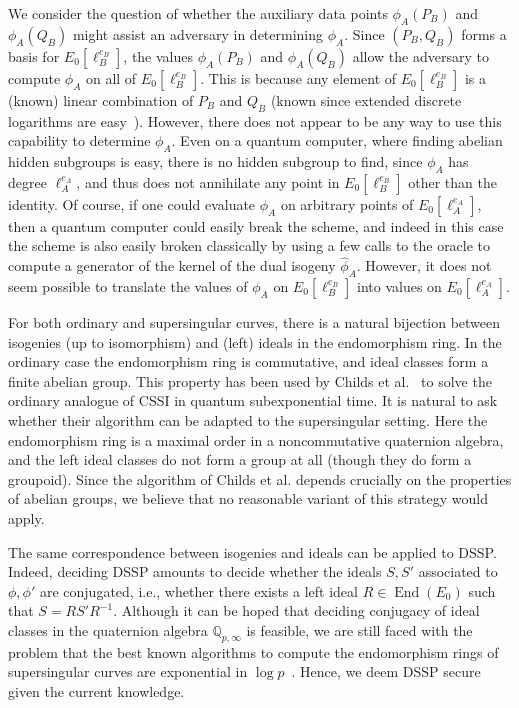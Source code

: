 \documentclass[jmc]{degruyter-journal-a}
\theoremstyle{definition}
\newcommand{\QQ}{{\mathbb{Q}}}
\newcommand{\End}{\operatorname{End}}
\begin{document}
We consider the question of whether the auxiliary data points
$\phi_A(P_B)$ and $\phi_A(Q_B)$ might assist an adversary in
determining $\phi_A$. Since $(P_B,Q_B)$ forms a basis for
$E_0[\ell_B^{e_B}]$, the values $\phi_A(P_B)$ and $\phi_A(Q_B)$ allow
the adversary to compute $\phi_A$ on all of $E_0[\ell_B^{e_B}]$. This
is because any element of $E_0[\ell_B^{e_B}]$ is a (known) linear
combination of $P_B$ and $Q_B$ (known since extended discrete
logarithms are easy~\cite{teske-ph}). However, there does not appear
to be any way to use this capability to determine $\phi_A$. Even on a
quantum computer, where finding abelian hidden subgroups is easy,
there is no hidden subgroup to find, since $\phi_A$ has degree
$\ell_A^{e_A}$, and thus does not annihilate any point in
$E_0[\ell_B^{e_B}]$ other than the identity. Of course, if one could
evaluate $\phi_A$ on arbitrary points of $E_0[\ell_A^{e_A}]$, then a
quantum computer could easily break the scheme, and indeed in this case the
scheme is also easily broken classically by using a few calls to the
oracle to compute a generator of the kernel of the dual isogeny 
$\hat{\phi}_A$. However, it does not seem possible to translate the values of
$\phi_A$ on $E_0[\ell_B^{e_B}]$ into values on $E_0[\ell_A^{e_A}]$.

For both ordinary and supersingular curves, there is a natural
bijection between isogenies (up to isomorphism) and (left) ideals in
the endomorphism ring. In the ordinary case the endomorphism ring is
commutative, and ideal classes form a finite abelian group. This
property has been used by Childs et al.~\cite{CJS} to solve the
ordinary analogue of CSSI in quantum subexponential time. It is
natural to ask whether their algorithm can be adapted to the
supersingular setting. Here the
endomorphism ring is a maximal order in a noncommutative quaternion
algebra, and the left ideal classes do not form a group at all (though
they do
form a groupoid). Since the algorithm of Childs et al. depends
crucially on the properties of abelian groups, we believe that no
reasonable variant of this strategy would apply.

The same correspondence between isogenies and ideals can be applied to
DSSP. Indeed, deciding DSSP amounts to decide whether the ideals
$S,S'$ associated to $\phi,\phi'$ are conjugated, i.e., whether there
exists a left ideal $R\in\End(E_0)$ such that $S=RS'R^{-1}$. Although
it can be hoped that deciding conjugacy of ideal classes in the
quaternion algebra $\QQ_{p,\infty}$ is feasible, we are still faced
with the problem that the best known algorithms to compute the
endomorphism rings of supersingular curves are exponential in $\log
p$~\cite{Kohel,cervino04,belding08-thesis}. Hence, we deem DSSP secure
given the current knowledge.
\end{document}
